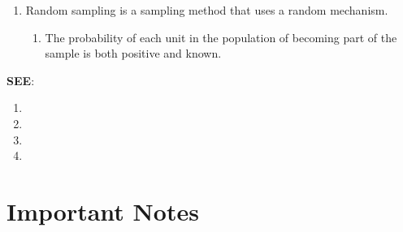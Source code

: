\begin{enumerate}[itemsep=0.5cm]
\begin{enumerate}
        \item Random sampling is a sampling method that uses a random mechanism. 
        \hfill \cite{statistics/book/Statistics-for-Data-Scientists/Maurits-Kaptein}
    
        \begin{enumerate}
            \item The probability of each unit in the population of becoming part of the sample is both positive and known.
            \hfill \cite{statistics/book/Statistics-for-Data-Scientists/Maurits-Kaptein}
        \end{enumerate}
    \end{enumerate}

    \vspace{0.2cm}
    \textbf{SEE}:
    \begin{enumerate}
        \item {}
        \item {}
        \item {}
        \item {}
    \end{enumerate}
\end{enumerate}

\clearpage




\clearpage


\clearpage


\clearpage


\clearpage







\clearpage
\section{Important Notes}

